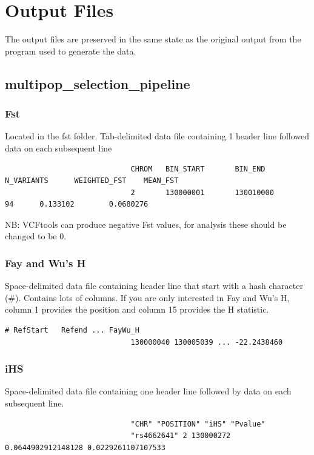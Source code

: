 \documentclass[a4paper,10pt]{article}
\begin{document}
                             \section{Output Files}
                             The output files are preserved in the same state as the original output from the program used to generate the data.
                             \subsection{multipop\_selection\_pipeline}
                             \subsubsection{Fst}
                             Located in the fst folder. Tab-delimited data file containing 1 header line followed data on each subsequent line\\
                             \begin{verbatim}
                             CHROM   BIN_START       BIN_END N_VARIANTS      WEIGHTED_FST    MEAN_FST  
                             2       130000001       130010000       94      0.133102        0.0680276 
                             \end{verbatim}
                             NB: VCFtools can produce negative Fst values, for analysis these should be changed to be 0.
                             \subsubsection{Fay and Wu's H}
                             Space-delimited data file containing header line that start with a hash character (\#). Contains lots of columns. If you are only interested in Fay and Wu's H, column 1 provides the position and column 15 provides the H statistic. \\
                             \begin{verbatim}
# RefStart   Refend ... FayWu_H
                             130000040 130005039 ... -22.2438460
                             \end{verbatim}
                             \subsubsection{iHS}
                             Space-delimited data file containing one header line followed by data on each subsequent line.\\
                             \begin{verbatim}
                             "CHR" "POSITION" "iHS" "Pvalue"
                             "rs4662641" 2 130000272 0.0644902912148128 0.0229261107107533
                             \end{verbatim}
\end{document}
